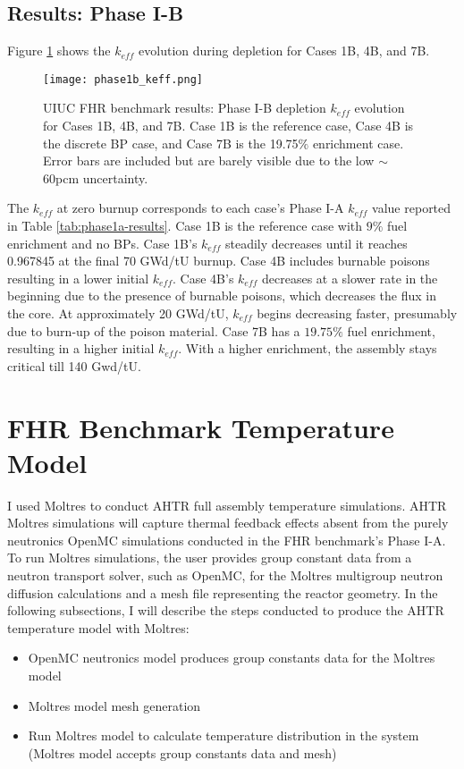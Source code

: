 \subsection{Results: Phase I-B}
\label{sec:fhr-benchmark-results-ib}
Figure \ref{fig:phase1b_keff} shows the $k_{eff}$ evolution during depletion 
for Cases 1B, 4B, and 7B.
\begin{figure}[htbp]
    \centering
    \texttt{[image: phase1b\_keff.png]} 
    \caption{\gls{UIUC} \gls{FHR} benchmark results: Phase I-B depletion 
    $k_{eff}$ evolution for Cases 1B, 4B, and 7B. Case 1B is the reference case, 
    Case 4B is the discrete \acrlong{BP} case, and Case 7B is the 19.75$\%$ 
    enrichment case. Error bars are included but are barely visible due to the 
    low $\sim$60pcm uncertainty.}
    \label{fig:phase1b_keff}
\end{figure}
The $k_{eff}$ at zero burnup corresponds to each case's Phase I-A $k_{eff}$ value 
reported in Table \ref{tab:phase1a-results}. 
Case 1B is the reference case with $9\%$ fuel enrichment and no \glspl{BP}. 
Case 1B's $k_{eff}$ steadily decreases until it reaches 0.967845 at the final 70 
GWd/tU burnup. 
Case 4B includes burnable poisons resulting in a lower initial $k_{eff}$. 
Case 4B's $k_{eff}$ decreases at a slower rate in the beginning due to the presence of 
burnable poisons, which decreases the flux in the core. 
At approximately 20 GWd/tU, $k_{eff}$ begins decreasing faster, presumably
due to burn-up of the poison material.   
Case 7B has a $19.75\%$ fuel enrichment, resulting in a higher initial $k_{eff}$. 
With a higher enrichment, the assembly stays critical till 140 Gwd/tU. 

\section{FHR Benchmark Temperature Model}
\label{sec:fhr-bm-temp}
I used Moltres \cite{lindsay_moltres_2017} to conduct \gls{AHTR} full assembly 
temperature simulations. 
AHTR Moltres simulations will capture thermal feedback effects absent from the purely 
neutronics OpenMC simulations conducted in the \gls{FHR} benchmark's Phase I-A.
To run Moltres simulations, the user provides group constant data from a neutron transport 
solver, such as OpenMC, for the Moltres multigroup neutron diffusion calculations and
a mesh file representing the reactor geometry. 
In the following subsections, I will describe the steps conducted to produce the 
\gls{AHTR} temperature model with Moltres:
\begin{itemize}
    \item OpenMC neutronics model produces group constants data for the Moltres model
    \item Moltres model mesh generation
    \item Run Moltres model to calculate temperature distribution in the system 
    (Moltres model accepts group constants data and mesh) 
\end{itemize}


